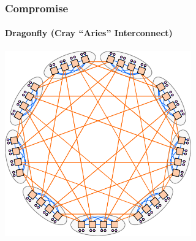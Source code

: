 \documentclass[xcolor={rgb,x11names,svgnames},rgb,x11names,svgnames]{beamer}
\begin{document}
\begin{frame}
  \frametitle{Compromise}
  \framesubtitle{Dragonfly (Cray ``Aries'' Interconnect)}

  \centering
  \includegraphics[height=8cm]{dragonfly.pdf}
\end{frame}


\end{document}
